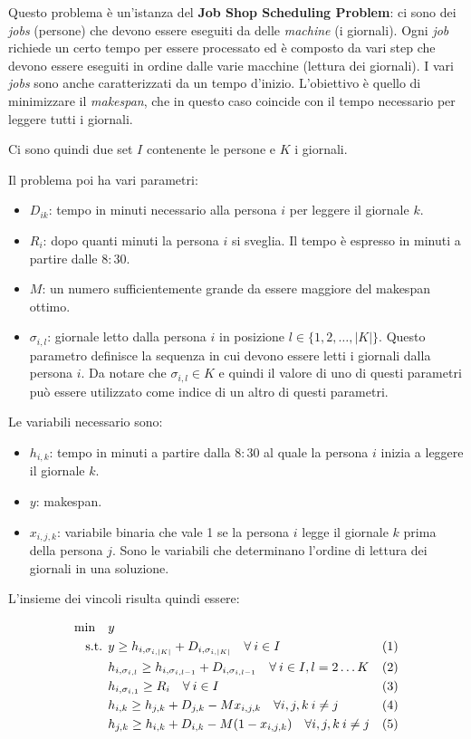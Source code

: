 Questo problema è un'istanza del \textbf{Job Shop Scheduling Problem}: ci sono dei \textit{jobs} (persone) che devono essere eseguiti da delle \textit{machine} (i giornali). Ogni \textit{job} richiede un certo tempo per essere processato ed è composto da vari step che devono essere eseguiti in ordine dalle varie macchine (lettura dei giornali). I vari \textit{jobs} sono anche caratterizzati da un tempo d'inizio.
L'obiettivo è quello di minimizzare il \textit{makespan}, che in questo caso coincide con il tempo necessario per leggere tutti i giornali. 

Ci sono quindi due set $I$ contenente le persone e $K$ i giornali.

Il problema poi ha vari parametri:
\begin{itemize}
	\item $D_{ik}$: tempo in minuti necessario alla persona $i$ per leggere il giornale $k$.
	\item $R_i$: dopo quanti minuti la persona $i$ si sveglia. Il tempo è espresso in minuti a partire dalle $8:30$.
	\item $M$: un numero sufficientemente grande da essere maggiore del makespan ottimo.
	\item $\sigma_{i,l}$: giornale letto dalla persona $i$ in posizione $l \in \{1,2,\ldots, |K| \}$. Questo parametro definisce la sequenza in cui devono essere letti i giornali dalla persona $i$. Da notare che $\sigma_{i,l} \in K$ e quindi il valore di uno di questi parametri può essere utilizzato come indice di un altro di questi parametri.
\end{itemize}

\noindent Le variabili necessario sono:
\begin{itemize}
	\item $h_{i,k}$: tempo in minuti a partire dalla $8:30$ al quale la persona $i$ inizia a leggere il giornale $k$.
	\item $y$: makespan.
	\item $x_{i,j,k}$: variabile binaria che vale 1 se la persona $i$ legge il giornale $k$ prima della persona $j$. Sono le variabili che determinano l'ordine di lettura dei giornali in una soluzione.
\end{itemize}

\noindent L'insieme dei vincoli risulta quindi essere:

\begin{align*}
\min \quad & y \\
\text{s.t. } & y \geq h_{i, \sigma_{i,|K|}} + D_{i, \sigma_{i,|K|}} \quad \forall \: i \in I &(1) \\
	& h_{i, \sigma_{i,l} } \geq h_{i, \sigma_{i,l-1} } + D_{i , \sigma_{i, l-1}} \quad \forall \:i \in I, l = 2 \ldots K &(2) \\
	& h_{i, \sigma_{i,1}} \geq R_i \quad \forall \: i \in I &(3) \\
	& h_{i,k} \geq h_{j,k} + D_{j,k} - M x_{i,j,k} \quad \forall i,j,k \: i \neq j &(4) \\
	& h_{j,k} \geq h_{i,k} + D_{i,k} - M (1 -x_{i,j,k} )\quad \forall i,j,k \: i \neq j &(5) \\
\end{align*}


